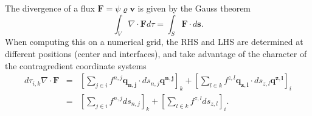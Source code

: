 The divergence of a flux $\mathbf{F}=\psi\varrho\mathbf{v}$ is given by the Gauss theorem
\begin{displaymath}
 \int_V\nabla\cdot\mathbf{F}d\tau = \int_S\mathbf{F}\cdot d\mathbf{s}.
\end{displaymath}
When computing this on a numerical grid, the RHS and LHS are determined at different positions (center and interfaces), and take advantage of the character of the contragredient coordinate systems
\begin{eqnarray}
 d\tau_{i,k}\nabla\cdot\mathbf{F} &=&
\left[\sum_{j\in i}f^{n,j}\mathbf{q_{n,j}}\cdot ds_{n,j}\mathbf{q^{n,j}}\right]_k
+\left[\sum_{l\in k}f^{z,l}\mathbf{q_{z,l}}\cdot ds_{z,l}\mathbf{q^{z,l}}\right]_i\nonumber\\
&=&\left[\sum_{j\in i}f^{n,j} ds_{n,j}\right]_k+\left[\sum_{l\in k}f^{z,l} ds_{z,l}\right]_i.
\label{divergence}
\end{eqnarray}
